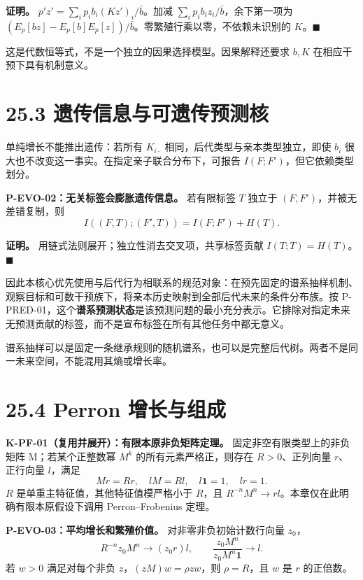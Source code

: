 \documentclass[
  11pt,
  oneside]{book}
\begin{document}
\textbf{证明。} \(p'z'=\sum_i p_ib_i(Kz')_i/\bar b\)。加减 \(\sum_i p_ib_iz_i/\bar b\)，余下第一项为 \((E_p[bz]-E_p[b]E_p[z])/\bar b\)。零繁殖行乘以零，不依赖未识别的 \(K\)。\(\blacksquare\)

这是代数恒等式，不是一个独立的因果选择模型。因果解释还要求 \(b,K\) 在相应干预下具有机制意义。

\section{25.3 遗传信息与可遗传预测核}\label{ux9057ux4f20ux4fe1ux606fux4e0eux53efux9057ux4f20ux9884ux6d4bux6838}

单纯增长不能推出遗传：若所有 \(K_{i\cdot}\) 相同，后代类型与亲本类型独立，即使 \(b_i\) 很大也不改变这一事实。在指定亲子联合分布下，可报告 \(I(F;F')\)，但它依赖类型划分。

\hypertarget{p-evo-02}{}\label{p-evo-02}

\textbf{P-EVO-02：无关标签会膨胀遗传信息。} 若有限标签 \(T\) 独立于 \((F,F')\)，并被无差错复制，则 \[I((F,T);(F',T))=I(F;F')+H(T).\]

\textbf{证明。} 用链式法则展开；独立性消去交叉项，共享标签贡献 \(I(T;T)=H(T)\)。\(\blacksquare\)

因此本核心优先使用与后代行为相联系的规范对象：在预先固定的谱系抽样机制、观察目标和可数干预族下，将亲本历史映射到全部后代未来的条件分布族。按 P-PRED-01，这个\textbf{谱系预测状态}是该预测问题的最小充分表示。它排除对指定未来无预测贡献的标签，而不是宣布标签在所有其他任务中都无意义。

谱系抽样可以是固定一条继承规则的随机谱系，也可以是完整后代树。两者不是同一未来空间，不能混用其熵或增长率。

\section{25.4 Perron 增长与组成}\label{perron-ux589eux957fux4e0eux7ec4ux6210}

\textbf{K-PF-01（复用并展开）：有限本原非负矩阵定理。} 固定非空有限类型上的非负矩阵 M；若某个正整数幂 \(M^k\) 的所有元素严格正，则存在 \(R>0\)、正列向量 \(r\)、正行向量 \(l\)，满足 \[Mr=Rr,\quad lM=Rl,\quad l\mathbf1=1,\quad lr=1.\] \(R\) 是单重主特征值，其他特征值模严格小于 \(R\)，且 \(R^{-n}M^n\to rl\)。本章仅在此明确有限本原假设下调用 Perron--Frobenius 定理。

\hypertarget{p-evo-03}{}\label{p-evo-03}

\textbf{P-EVO-03：平均增长和繁殖价值。} 对非零非负初始计数行向量 \(z_0\)， \[R^{-n}z_0M^n\to(z_0r)l,\qquad
\frac{z_0M^n}{z_0M^n\mathbf1}\to l.\] 若 \(w>0\) 满足对每个非负 \(z\)，\((zM)w=\rho zw\)，则 \(\rho=R\)，且 \(w\) 是 \(r\) 的正倍数。
\end{document}
